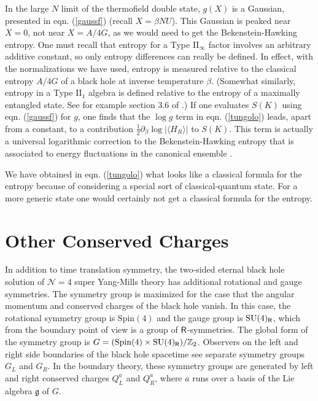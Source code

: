 \documentclass[11pt,a4paper]{article}
\def\g{{\mathfrak g}}
\def\U{{ U}}
\def\N{{\mathcal N}}
\def\Z{{\mathbb Z}}
\def\la{\langle}
\def\Spin{{\mathrm{Spin}}}
\def\SU{{\mathrm{SU}}}
\def\ra{\rangle}
\def\Rr{{\sf R}}
\begin{document}
In the large $N$ limit of the thermofield double state, $g(X)$ is a Gaussian, presented in eqn. (\ref{gaussf}) (recall $X=\beta N\U$).  This Gaussian
is peaked near $X=0$, not near $X=A/4G$, as we would need to get the Bekenstein-Hawking entropy.   One must recall that entropy for a Type II$_\infty$
factor involves an arbitrary additive constant, so only entropy differences can really be defined.   In effect, with the normalizations we have used, entropy is
measured relative to the classical entropy $A/4G$ of a black hole at inverse temperature $\beta$.   (Somewhat similarly, entropy in a Type II$_1$
algebra is defined relative to the entropy of a maximally entangled state.   See for example section 3.6 of \cite{Lecture}.)   If one evaluates $S(K)$ using
eqn. (\ref{gaussf}) for $g$, one finds that the $\log g$ term in eqn. (\ref{tungolo}) leads, apart from a constant,
 to a contribution $\frac{1}{2}\partial_\beta \log |\la H_R\ra|$ to $S(K)$.   This term is actually a universal logarithmic correction to the Bekenstein-Hawking
 entropy that is associated to energy fluctuations in the canonical ensemble \cite{DMB}.

We have obtained in eqn. (\ref{tungolo}) what looks like a classical formula for the entropy because of considering a special sort of classical-quantum state.
For a more generic state one would certainly not get a classical formula for the entropy.


\section{Other Conserved Charges}\label{symmetries}

In addition to time translation symmetry, the two-sided eternal black hole solution of $\N=4$ super Yang-Mills theory has additional rotational and gauge symmetries.
The symmetry group is maximized for the case that the angular momentum and conserved charges of the black hole vanish.    In this case, the rotational
symmetry group is $\Spin(4)$ and the gauge group is $\SU(4)_\Rr$, which from the boundary point of view is a group of $\Rr$-symmetries.  The global form
of the symmetry group is $G=(\Spin(4)\times \SU(4)_\Rr)/\Z_2$.    Observers on the left and right side boundaries of the black hole spacetime see separate
symmetry groups $G_L$ and $G_R$.   In the boundary theory, these symmetry groups are generated by left and right conserved charges $Q^a_L$ and $Q^a_R$,
where $a$ runs over a basis of the Lie algebra $\g$ of $G$.   
\end{document}
